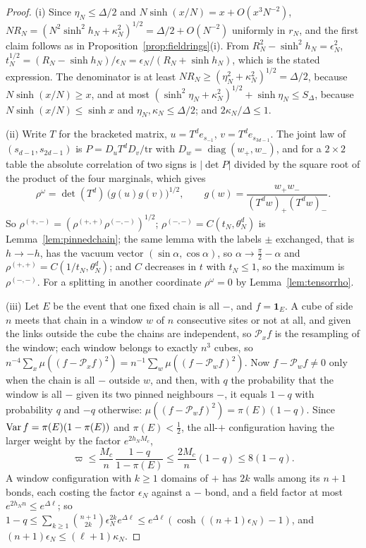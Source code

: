 \begin{proof}
(i) Since $\eta_N\le\Delta/2$ and $N\sinh(x/N)=x+O(x^3N^{-2})$, $NR_N=(N^2
\sinh^2h_N+\kappa_N^2)^{1/2}=\Delta/2+O(N^{-2})$ uniformly in $r_N$, and the
first claim follows as in Proposition~\ref{prop:fieldrings}(i). From $R_N^2-
\sinh^2h_N=\epsilon_N^2$, $t_N^{1/2}=(R_N-\sinh h_N)/\epsilon_N=\epsilon_N/
(R_N+\sinh h_N)$, which is the stated expression. The denominator is at
least $NR_N\ge(\eta_N^2+\kappa_N^2)^{1/2}=\Delta/2$, because $N\sinh(x/N)\ge
x$, and at most $(\sinh^2\eta_N+\kappa_N^2)^{1/2}+\sinh\eta_N\le S_\Delta$,
because $N\sinh(x/N)\le\sinh x$ and $\eta_N,\kappa_N\le\Delta/2$; and $2\kappa
_N/\Delta\le1$.

(ii) Write $T$ for the bracketed matrix, $u=T^de_{s_{-1}}$, $v=T^de_{s_{3d-1}
}$. The joint law of $(s_{d-1},s_{2d-1})$ is $P=D_uT^dD_v/\mathrm{tr}$ with
$D_w=\operatorname{diag}(w_+,w_-)$, and for a $2\times2$ table the absolute
correlation of two signs is $|\det P|$ divided by the square root of the
product of the four marginals, which gives
\[
\rho^\omega=\det(T^d)\,\bigl(g(u)g(v)\bigr)^{1/2},\qquad g(w)=\frac{w_+w_-}
{(T^dw)_+(T^dw)_-}.
\]
So $\rho^{(+,-)}=(\rho^{(+,+)}\rho^{(-,-)})^{1/2}$; $\rho^{(-,-)}=C(t_N,\theta_N
^d)$ is Lemma~\ref{lem:pinnedchain}; the same lemma with the labels $\pm$
exchanged, that is $h\to-h$, has the vacuum vector $(\sin\alpha,\cos\alpha)$,
so $\alpha\to\frac\pi2-\alpha$ and $\rho^{(+,+)}=C(1/t_N,\theta_N^d)$; and $C$
decreases in $t$ with $t_N\le1$, so the maximum is $\rho^{(-,-)}$. For a
splitting in another coordinate $\rho^\omega=0$ by Lemma~\ref{lem:tensorrho}.

(iii) Let $E$ be the event that one fixed chain is all $-$, and $f=\mathbf 1_
E$. A cube of side $n$ meets that chain in a window $w$ of $n$ consecutive
sites or not at all, and given the links outside the cube the chains are
independent, so $\mathcal P_xf$ is the resampling of the window; each window
belongs to exactly $n^3$ cubes, so $n^{-4}\sum_x\mu((f-\mathcal P_xf)^2)=n^{-1}
\sum_w\mu((f-\mathcal P_wf)^2)$. Now $f-\mathcal P_wf\ne0$ only when the chain
is all $-$ outside $w$, and then, with $q$ the probability that the window
is all $-$ given its two pinned neighbours $-$, it equals $1-q$ with
probability $q$ and $-q$ otherwise: $\mu((f-\mathcal P_wf)^2)=\pi(E)(1-q)$.
Since $\operatorname{Var} f=\pi(E)(1-\pi(E))$ and $\pi(E)<\frac12$, the all-$+$
configuration having the larger weight by the factor $e^{2h_NM_c}$,
\[
\varpi\le\frac{M_c}n\,\frac{1-q}{1-\pi(E)}\le\frac{2M_c}n(1-q)\le8(1-q).
\]
A window configuration with $k\ge1$ domains of $+$ has $2k$ walls among its
$n+1$ bonds, each costing the factor $\epsilon_N$ against a $-$ bond, and a
field factor at most $e^{2h_Nn}\le e^{\Delta\ell}$; so $1-q\le\sum_{k\ge1}
\binom{n+1}{2k}\epsilon_N^{2k}e^{\Delta\ell}\le e^{\Delta\ell}(\cosh((n+1)
\epsilon_N)-1)$, and $(n+1)\epsilon_N\le(\ell+1)\kappa_N$.


\end{proof}

